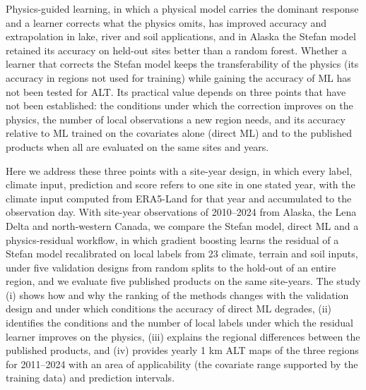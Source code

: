 Physics-guided learning, in which a physical model carries the dominant response and a learner corrects what the physics omits, has improved accuracy and extrapolation in lake, river and soil applications\cite{Willard2022,Read2019,Jia2021}, and in Alaska the Stefan model retained its accuracy on held-out sites better than a random forest\cite{Gautam2025}. Whether a learner that corrects the Stefan model keeps the transferability of the physics (its accuracy in regions not used for training) while gaining the accuracy of ML has not been tested for ALT. Its practical value depends on three points that have not been established: the conditions under which the correction improves on the physics, the number of local observations a new region needs, and its accuracy relative to ML trained on the covariates alone (direct ML) and to the published products when all are evaluated on the same sites and years.

Here we address these three points with a site-year design, in which every label, climate input, prediction and score refers to one site in one stated year, with the climate input computed from ERA5-Land for that year and accumulated to the observation day\cite{munozsabater2021_era5_land}. With \nncyAll{} site-year observations of 2010--2024 from Alaska, the Lena Delta and north-western Canada, we compare the Stefan model, direct ML and a physics-residual workflow, in which gradient boosting learns the residual of a Stefan model recalibrated on local labels from 23 climate, terrain and soil inputs, under five validation designs from random splits to the hold-out of an entire region, and we evaluate five published products on the same site-years. The study (i) shows how and why the ranking of the methods changes with the validation design and under which conditions the accuracy of direct ML degrades, (ii) identifies the conditions and the number of local labels under which the residual learner improves on the physics, (iii) explains the regional differences between the published products, and (iv) provides yearly 1 km ALT maps of the three regions for 2011--2024 with an area of applicability (the covariate range supported by the training data) and prediction intervals.
